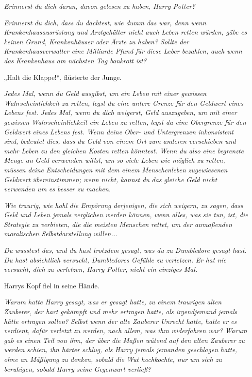 {\emph{Erinnerst du dich daran, davon gelesen zu haben, Harry Potter?}

\emph{Erinnerst du dich, dass du dachtest, wie dumm das war, denn wenn Krankenhausausrüstung und Arztgehälter nicht auch Leben retten würden, gäbe es keinen Grund, Krankenhäuser oder Ärzte zu haben? Sollte der Krankenhausverwalter eine Milliarde Pfund für diese Leber bezahlen, auch wenn das Krankenhaus am nächsten Tag bankrott ist?}

„Halt die Klappe!“, flüsterte der Junge.

\emph{Jedes Mal, wenn du Geld ausgibst, um ein Leben mit einer gewissen Wahrscheinlichkeit zu retten, legst du eine untere Grenze für den Geldwert eines Lebens fest. Jedes Mal, wenn du dich weigerst, Geld auszugeben, um mit einer gewissen Wahrscheinlichkeit ein Leben zu retten, legst du eine Obergrenze für den Geldwert eines Lebens fest. Wenn deine Ober- und Untergrenzen inkonsistent sind, bedeutet dies, dass du Geld von einem Ort zum anderen verschieben und mehr Leben zu den gleichen Kosten retten könntest. Wenn du also eine begrenzte Menge an Geld verwenden willst, um so viele Leben wie möglich zu retten, müssen deine Entscheidungen mit dem einem Menschenleben zugewiesenen Geldwert übereinstimmen; wenn nicht, kannst du das gleiche Geld nicht verwenden um es besser zu machen.}

\emph{Wie traurig, wie hohl die Empörung derjenigen, die sich weigern, zu sagen, dass Geld und Leben jemals verglichen werden können, wenn alles, was sie tun, ist, die Strategie zu verbieten, die die meisten Menschen rettet, um der anmaßenden moralischen Selbstdarstellung willen...}

\emph{Du wusstest das, und du hast trotzdem gesagt, was du zu Dumbledore gesagt hast. Du hast absichtlich versucht, Dumbledores Gefühle zu verletzen. Er hat nie versucht, dich zu verletzen, Harry Potter, nicht ein einziges Mal.}

Harrys Kopf fiel in seine Hände.

\emph{Warum hatte Harry gesagt, was er gesagt hatte, zu einem traurigen alten Zauberer,} \emph{der hart gekämpft und mehr ertragen hatte, als irgendjemand jemals hätte ertragen sollen?} \emph{Selbst wenn der alte Zauberer Unrecht hatte, hatte er es verdient, dafür verletzt zu werden, nach allem, was ihm widerfahren war? Warum gab es einen Teil von ihm, der über die Maßen wütend auf den alten Zauberer zu werden schien, ihn härter schlug, als Harry jemals jemanden geschlagen hatte, ohne an Mäßigung zu denken, sobald die Wut hochkochte, nur um sich zu beruhigen, sobald Harry seine Gegenwart verließ?}

}
